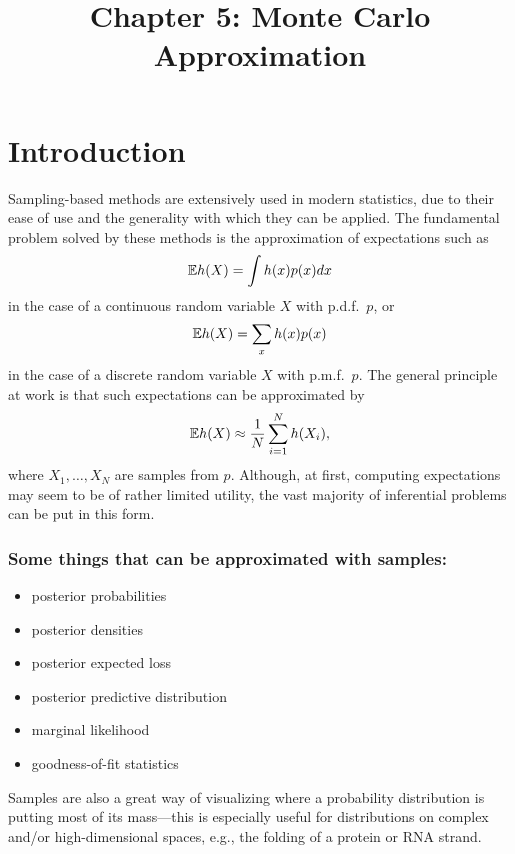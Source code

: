 \documentclass[12pt]{article}
\title{Chapter 5: Monte Carlo Approximation}
\author{}
\date{}
\begin{document}
\maketitle

\tableofcontents 

\thispagestyle{firststyle}

\vspace{5em}

\section{Introduction}

Sampling-based methods are extensively used in modern statistics, due to their ease of use and the generality with which they can be applied. The fundamental problem solved by these methods is the approximation of expectations such as
$$\mathbb{E} h(X) =\int h(x) p(x) d x $$
in the case of a continuous random variable $X$ with p.d.f.\ $p$, or 
$$\mathbb{E} h(X) =\sum_x h(x) p(x) $$
in the case of a discrete random variable $X$ with p.m.f.\ $p$. The general principle at work is that such expectations can be approximated by
$$\mathbb{E} h(X)\approx \frac{1}{N}\sum_{i = 1}^N h(X_i),$$
where $X_1,\dotsc,X_N$ are samples from $p$. Although, at first, computing expectations may seem to be of rather limited utility, the vast majority of inferential problems can be put in this form.

\subsubsection*{Some things that can be approximated with samples:}
\begin{itemize}
\item posterior probabilities
\item posterior densities
\item posterior expected loss
\item posterior predictive distribution
\item marginal likelihood
\item goodness-of-fit statistics
\end{itemize}

Samples are also a great way of visualizing where a probability distribution is putting most of its mass---this is especially useful for distributions on complex and/or high-dimensional spaces, e.g., the folding of a protein or RNA strand.
\end{document}
